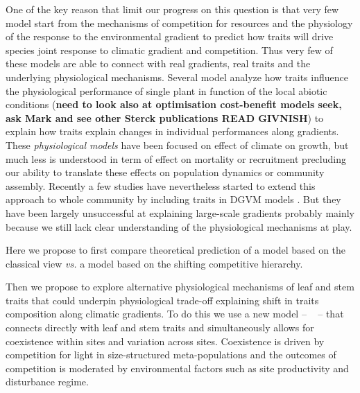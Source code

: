 \documentclass[a4paper,11pt]{article}
\begin{document}
One of the key reason that limit our progress on this question is that very few model start from the mechanisms of competition for resources and the physiology of the response to the environmental gradient to predict how traits will drive species joint response to climatic gradient and competition. Thus very few of these models are able to connect with real gradients,
real traits and the underlying physiological mechanisms. Several model
analyze how traits influence the physiological performance of single
plant in function of the local abiotic conditions \citep{Sterck-2011}
(\textbf{need to look also at optimisation cost-benefit models seek, ask Mark
and see other Sterck publications READ GIVNISH}) to explain how traits explain changes in individual performances along gradients. These \textit{physiological models} have been focused on effect of climate on growth, but much less is understood in term of effect on mortality or recruitment precluding our ability to translate these effects on population dynamics or community assembly. Recently a few studies have nevertheless started to extend this approach to whole community by including traits in DGVM models \citep[see][]{Sakschewski-2015,Scheiter-2013}. But they have been largely unsuccessful at explaining large-scale gradients probably mainly because we still lack clear understanding of the physiological mechanisms at play.

Here we propose to first compare theoretical prediction of a model based on the classical view \textit{vs.} a model based on the shifting competitive hierarchy. 

Then we propose to explore alternative physiological mechanisms of leaf and stem traits that could underpin physiological trade-off explaining shift in traits composition along climatic gradients. To do this we use a new model -- \plant\ \citep{Falster-2016,Falster-2017} -- that connects directly with leaf and stem traits and simultaneously allows for coexistence within sites and variation across sites.  Coexistence is driven by competition for light in size-structured meta-populations and the outcomes of competition is moderated by environmental factors such as site productivity and disturbance regime.
\end{document}
